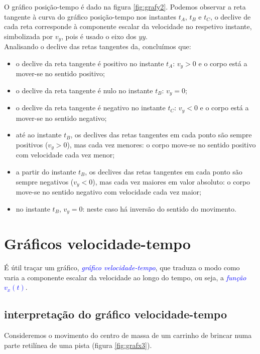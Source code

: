 \documentclass[a4paper,12pt]{article}
\begin{document}
	O gráfico posição-tempo é dado na figura \ref{fig:grafy2}. Podemos observar a reta tangente à curva do gráfico posição-tempo nos instantes $t_A$, $t_B$ e $t_C$, o declive de cada reta corresponde à componente escalar da velocidade no respetivo instante, simbolizada por $v_y$, pois é usado o eixo dos $yy$.\\
	Analisando o declive das retas tangentes da, concluímos que:
	\begin{itemize}
		\item o declive da reta tangente é positivo no instante $t_A$: $v_y > 0$ e o corpo está a mover-se no sentido positivo;
		\item o declive da reta tangente é nulo no instante $t_B$: $v_y = 0$;
		\item o declive da reta tangente é negativo no instante $t_C$: $v_y < 0$ e o corpo está a mover-se no sentido negativo;
		\item até ao instante $t_B$, os declives das retas tangentes em cada ponto são sempre positivos ($v_y > 0$), mas cada vez menores: o corpo move-se no sentido positivo com velocidade cada vez menor;
		\item a partir do instante $t_B$, os declives das retas tangentes em cada ponto são sempre negativos ($v_y < 0$), mas cada vez maiores em valor absoluto: o corpo move-se no sentido negativo com velocidade cada vez maior;
		\item no instante $t_B$, $v_y = 0$: neste caso há inversão do sentido do movimento.
	\end{itemize}
	
	\section{Gráficos velocidade-tempo}
	
	É útil traçar um gráfico, \emph{\textcolor{blue}{gráfico velocidade-tempo}}, que traduza o modo como varia a componente escalar da velocidade ao longo do tempo, ou seja, a \emph{\textcolor{blue}{função $v_x(t)$}}.
	
	\subsection{interpretação do gráfico velocidade-tempo}
	Consideremos o movimento do centro de massa de um carrinho de brincar numa parte retilínea de uma pista (figura \ref{fig:grafx3}).
	
\end{document}

